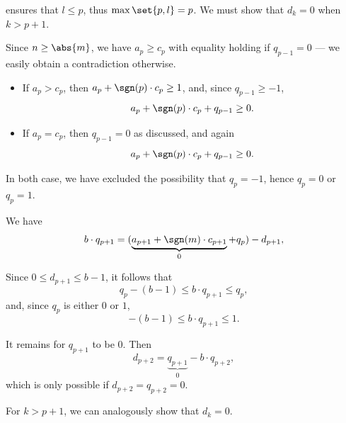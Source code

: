 \begin{defproof}
    ensures that \( l \leq p \), thus \( \max\set{ p, l } = p \). We must show that \( d_k = 0 \) when \( k > p + 1 \).

  Since \( n \geq \abs{m} \), we have \( a_p \geq c_p \) with equality holding if \( q_{p - 1} = 0 \) --- we easily obtain a contradiction otherwise.

  \begin{itemize}
    \item If \( a_p > c_p \), then \( a_p + \sgn(p) \cdot c_p \geq 1 \), and, since \( q_{p - 1} \geq -1 \),
    \begin{equation*}
      a_p + \sgn(p) \cdot c_p + q_{p - 1} \geq 0.
    \end{equation*}

    \item If \( a_p = c_p \), then \( q_{p - 1} = 0 \) as discussed, and again
    \begin{equation*}
      a_p + \sgn(p) \cdot c_p + q_{p - 1} \geq 0.
    \end{equation*}
  \end{itemize}

  In both case, we have excluded the possibility that \( q_p = -1 \), hence \( q_p = 0 \) or \( q_p = 1 \).

  We have
  \begin{equation*}
    b \cdot q_{p + 1} = (\underbrace{a_{p + 1} + \sgn(m) \cdot c_{p + 1}}_0 + q_p) - d_{p + 1},
  \end{equation*}

  Since \( 0 \leq d_{p + 1} \leq b - 1 \), it follows that
  \begin{equation*}
    q_p - (b - 1) \leq b \cdot q_{p + 1} \leq q_p,
  \end{equation*}
  and, since \( q_p \) is either \( 0 \) or \( 1 \),
  \begin{equation*}
    -(b - 1) \leq b \cdot q_{p + 1} \leq 1.
  \end{equation*}

  It remains for \( q_{p + 1} \) to be \( 0 \). Then
  \begin{equation*}
    d_{p + 2} = \underbrace{q_{p + 1}}_{0} - b \cdot q_{p + 2},
  \end{equation*}
  which is only possible if \( d_{p + 2} = q_{p + 2} = 0 \).

  For \( k > p + 1 \), we can analogously show that \( d_k = 0 \).


\end{defproof}
